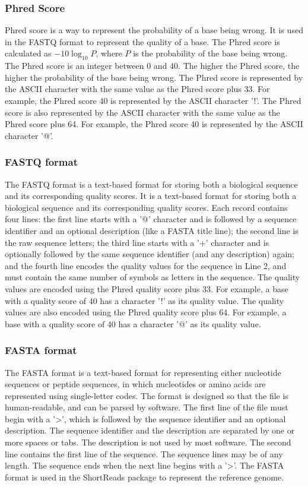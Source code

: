 \documentclass[12pt]{article}
\begin{document}
\subsubsection{Phred Score}
Phred score is a way to represent the probability of a base being wrong.
It is used in the FASTQ format to represent the quality of a base. The Phred score is calculated as $-10 \log_{10} P$, where $P$ is the probability of the base being wrong. The Phred score is an integer between 0 and 40. The higher the Phred score, the higher the probability of the base being wrong. The Phred score is represented by the ASCII character with the same value as the Phred score plus 33. For example, the Phred score 40 is represented by the ASCII character '!'. The Phred score is also represented by the ASCII character with the same value as the Phred score plus 64. For example, the Phred score 40 is represented by the ASCII character '@'.

\subsubsection{FASTQ format}
The FASTQ format is a text-based format for storing both a biological sequence and its corresponding quality scores.
It is a text-based format for storing both a biological sequence and its corresponding quality scores. 
Each record contains four lines: the first line starts with a '@' character and is followed by a sequence identifier and an optional description (like a FASTA title line); the second line is the raw sequence letters; the third line starts with a '+' character and is optionally followed by the same sequence identifier (and any description) again; and the fourth line encodes the quality values for the sequence in Line 2, and must contain the same number of symbols as letters in the sequence. The quality values are encoded using the Phred quality score plus 33. For example, a base with a quality score of 40 has a character '!' as its quality value. The quality values are also encoded using the Phred quality score plus 64. For example, a base with a quality score of 40 has a character '@' as its quality value.

\subsubsection{FASTA format}
The FASTA format is a text-based format for representing either nucleotide sequences or peptide sequences, in which nucleotides or amino acids are represented using single-letter codes.
The format is designed so that the file is human-readable, and can be parsed by software. The first line of the file must begin with a '>', which is followed by the sequence identifier and an optional description.
The sequence identifier and the description are separated by one or more spaces or tabs. The description is not used by most software. The second line contains the first line of the sequence. The sequence lines may be of any length.
The sequence ends when the next line begins with a '>'. The FASTA format is used in the ShortReads package to represent the reference genome.
\end{document}
